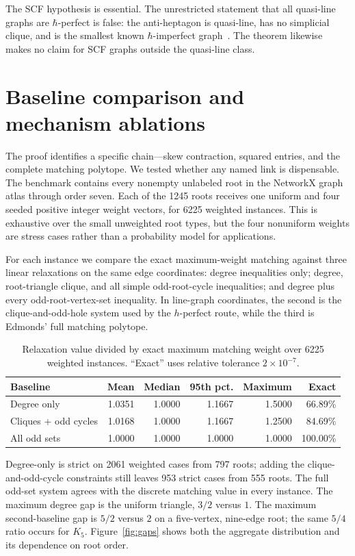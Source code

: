 \documentclass[11pt,a4paper]{article}
\theoremstyle{remark}
\begin{document}
The SCF hypothesis is essential. The unrestricted statement that all
quasi-line graphs are $\hbar$-perfect is false: the anti-heptagon is
quasi-line, has no simplicial clique, and is the smallest known
$\hbar$-imperfect graph~\cite{xu}. The theorem likewise makes no claim for
SCF graphs outside the quasi-line class.

\section{Baseline comparison and mechanism ablations}

The proof identifies a specific chain---skew contraction, squared entries,
and the complete matching polytope. We tested whether any named link is
dispensable. The benchmark contains every nonempty unlabeled root in the
NetworkX graph atlas through order seven. Each of the 1245 roots receives one
uniform and four seeded positive integer weight vectors, for 6225 weighted
instances. This is exhaustive over the small unweighted root types, but the
four nonuniform weights are stress cases rather than a probability model for
applications.

For each instance we compare the exact maximum-weight matching against three
linear relaxations on the same edge coordinates: degree inequalities only;
degree, root-triangle clique, and all simple odd-root-cycle inequalities; and
degree plus every odd-root-vertex-set inequality. In line-graph coordinates,
the second is the clique-and-odd-hole system used by the $h$-perfect route,
while the third is Edmonds' full matching polytope.

\begin{table}[H]
\centering
\caption{Relaxation value divided by exact maximum matching weight over 6225
weighted instances. ``Exact'' uses relative tolerance $2\times10^{-7}$.}
\label{tab:baselines}
\footnotesize
\begin{tabular}{lrrrrr}
\toprule
Baseline & Mean & Median & 95th pct. & Maximum & Exact \\
\midrule
Degree only & 1.0351 & 1.0000 & 1.1667 & 1.5000 & 66.89\% \\
Cliques + odd cycles & 1.0168 & 1.0000 & 1.1667 & 1.2500 & 84.69\% \\
All odd sets & 1.0000 & 1.0000 & 1.0000 & 1.0000 & 100.00\% \\
\bottomrule
\end{tabular}
\end{table}

Degree-only is strict on 2061 weighted cases from 797 roots; adding the
clique-and-odd-cycle constraints still leaves 953 strict cases from 555 roots.
The full odd-set system agrees with the discrete matching value in every
instance. The maximum degree gap is the uniform triangle, $3/2$ versus $1$.
The maximum second-baseline gap is $5/2$ versus $2$ on a five-vertex,
nine-edge root; the same $5/4$ ratio occurs for $K_5$. Figure~\ref{fig:gaps}
shows both the aggregate distribution and its dependence on root order.
\end{document}
